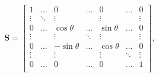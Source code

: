 \documentclass{emulateapj}
\newcommand\sini[0]{\sin{\theta}}
\newcommand\cosi[0]{\cos{\theta}}
\begin{document}
        \begin{equation}
            \bm{S}
            = 
            \begin{bmatrix}
                1      & \ldots & 0      & \ldots & 0       & \ldots & 0      \\
                
                \vdots & \ddots & \vdots &        & \vdots  &        & \vdots \\
                
                0      & \ldots & \cosi      & \ldots & \sini       & \ldots & 0      \\
                
                \vdots &        & \vdots & \ddots & \vdots  &        & \vdots \\
                
                0      & \ldots & -\sini      & \ldots & \cosi       & \ldots & 0      \\

                \vdots &        & \vdots &        & \vdots  & \ddots & \vdots \\
                
                0      & \ldots & 0      & \ldots & 0       & \ldots & 1      \\
            \end{bmatrix},
        \end{equation}
\end{document}
